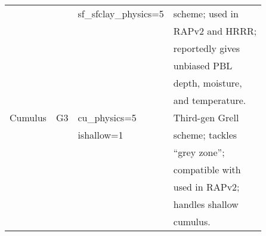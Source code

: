 \begin{tabular}{|l|l|l|l|}
             &               & sf\_sfclay\_physics=5       & scheme; used in \\
             &               &                             & RAPv2 and HRRR; \\
             &               &                             & reportedly gives\\
             &               &                             & unbiased PBL    \\
             &               &                             & depth, moisture,\\
             &               &                             & and temperature.\\ \hline
Cumulus      & G3            & cu\_physics=5               & Third-gen Grell\\
             &               & ishallow=1                  & scheme; tackles\\
             &               &                             & ``grey zone''; \\
             &               &                             & compatible with\\
             &               &                             & used in RAPv2; \\
             &               &                             & handles shallow\\
             &               &                             & cumulus.\\ \hline
\end{tabular}\\

